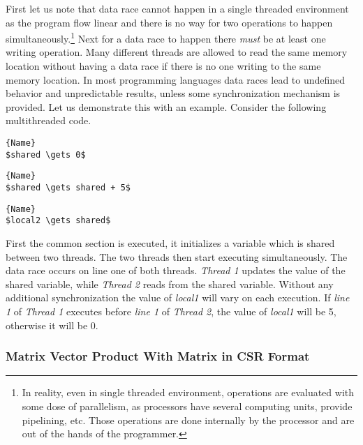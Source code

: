 First let us note that data race cannot happen in a single threaded environment as the program flow linear and there is no way for two operations to happen simultaneously.\footnote{In reality, even in single threaded environment, operations are evaluated with some dose of parallelism, as processors have several computing units, provide pipelining, etc. Those operations are done internally by the processor and are out of the hands of the programmer.} Next for a data race to happen there \textit{must} be at least one writing operation. Many different threads are allowed to read the same memory location without having a data race if there is no one writing to the same memory location. In most programming languages data races lead to undefined behavior and unpredictable results, unless some synchronization mechanism is provided. Let us demonstrate this with an example. Consider the following multithreaded code.
\begin{lstlisting}[caption=Common section,frame=tlrb, mathescape=true]{Name}
$shared \gets 0$
\end{lstlisting}
\noindent\begin{minipage}{.45\textwidth}
\begin{lstlisting}[caption=Thread 1,frame=tlrb, mathescape=true]{Name}
$shared \gets shared + 5$
\end{lstlisting}
\end{minipage}\hfill
\begin{minipage}{.45\textwidth}
\begin{lstlisting}[caption=Thread 2,frame=tlrb, mathescape=true]{Name}
$local2 \gets shared$
\end{lstlisting}
\end{minipage}

First the common section is executed, it initializes a variable which is shared between two threads. The two threads then start executing simultaneously. The data race occurs on line one of both threads. \textit{Thread 1} updates the value of the shared variable, while \textit{Thread 2} reads from the shared variable. Without any additional synchronization the value of \textit{local1} will vary on each execution. If \textit{line 1} of \textit{Thread 1} executes before \textit{line 1} of \textit{Thread 2}, the value of \textit{local1} will be 5, otherwise it will be 0.

\subsubsection{Matrix Vector Product With Matrix in CSR Format}

